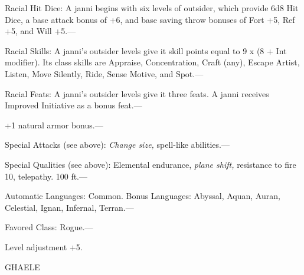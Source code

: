 \documentclass{article}
\begin{document}
Racial Hit Dice: A janni begins with six levels of outsider, which provide 6d8 
Hit Dice, a base attack bonus of +6, and base saving throw bonuses of Fort +5, 
Ref +5, and Will +5.---

Racial Skills: A janni's outsider levels give it skill points equal to 9 x (8 + 
Int modifier). Its class skills are Appraise, Concentration, Craft (any), Escape 
Artist, Listen, Move Silently, Ride, Sense Motive, and Spot.---

Racial Feats: A janni's outsider levels give it three feats. A janni receives Improved 
Initiative as a bonus feat.--- 

\parindent=3pt
+1 natural armor bonus.---

\parindent=0pt
Special Attacks (see above): \textit{Change size, }spell-like abilities.---

Special Qualities (see above): Elemental endurance, \textit{plane shift, }resistance 
to fire 10, telepathy. 100 ft.---

Automatic Languages: Common. Bonus Languages: Abyssal, Aquan, Auran, Celestial, 
Ignan, Infernal, Terran.---

Favored Class: Rogue.---

Level adjustment +5.

\vspace{12pt}
{\LARGE{}GHAELE}
\end{document}
